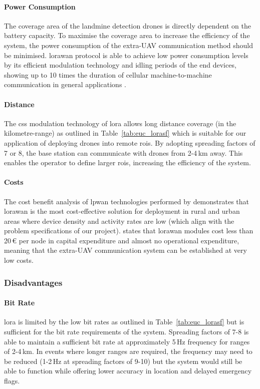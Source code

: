 \paragraph{Power Consumption} The coverage area of the landmine detection drones is directly dependent on the battery capacity. To maximise the coverage area to increase the efficiency of the system, the power consumption of the extra-\gls{UAV} communication method should be minimised. \gls{lorawan} protocol is able to achieve low power consumption levels by its efficient modulation technology and idling periods of the end devices, showing up to 10 times the duration of cellular machine-to-machine communication in general applications \cite{semtech2024lora}. 

\paragraph{Distance} The \gls{css} modulation technology of \gls{lora} allows long distance coverage (in the kilometre-range) as outlined in Table~\ref{tab:euc_lorasf} which is suitable for our application of deploying drones into remote \gls{roi}s. By adopting spreading factors of 7 or 8, the base station can communicate with drones from 2-4\,km away. This enables the operator to define larger \gls{roi}s, increasing the efficiency of the system. 

\paragraph{Costs} The cost benefit analysis of \gls{lpwan} technologies performed by \cite{hossain2021lpwancosts} demonstrates that \gls{lorawan} is the most cost-effective solution for deployment in rural and urban areas where device density and activity rates are low (which align with the problem specifications of our project). \cite{stokking2021lorawan} states that \gls{lorawan} modules cost less than 20\,€ per node in capital expenditure and almost no operational expenditure, meaning that the extra-\gls{UAV} communication system can be established at very low costs.
 
\subsubsection{Disadvantages}

\paragraph{Bit Rate} \gls{lora} is limited by the low bit rates as outlined in Table~\ref{tab:euc_lorasf} but is sufficient for the bit rate requirements of the system. Spreading factors of 7-8 is able to maintain a sufficient bit rate at approximately 5\,Hz frequency for ranges of 2-4\,km. In events where longer ranges are required, the frequency may need to be reduced (1-2\,Hz at spreading factors of 9-10) but the system would still be able to function while offering lower accuracy in location and delayed emergency flags. 

